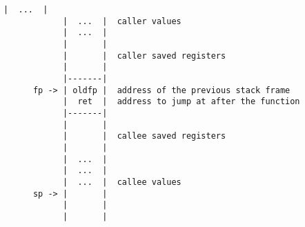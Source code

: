 \begin{Verbatim}[baselinestretch=0.2]
            |  ...  |
            |  ...  |  caller values
            |  ...  |
            |       |
            |       |  caller saved registers
            |       |
            |-------|
      fp -> | oldfp |  address of the previous stack frame
            |  ret  |  address to jump at after the function
            |-------|
            |       |
            |       |  callee saved registers
            |       |
            |  ...  |
            |  ...  |
            |  ...  |  callee values
      sp -> |       |
            |       |
            |       |
\end{Verbatim}
